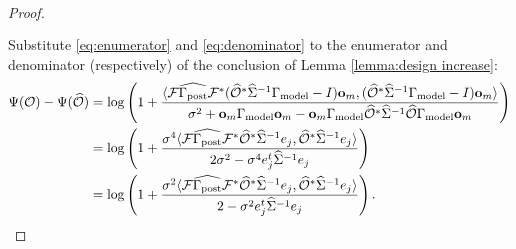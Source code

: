 \documentclass{amsart}
\numberwithin{equation}{section}
\begin{document}
\begin{proof}
\begin{align}
\begin{split}
    \end{split}
  \end{align}
  Substitute \eqref{eq:enumerator} and \eqref{eq:denominator} to
  the enumerator and denominator (respectively) of the conclusion of
  Lemma \ref{lemma:design increase}:
  \begin{align*}
    \Psi( \mathcal{O} ) - \Psi (\widehat{\mathcal{O}} ) &=
    \log \left ( 1 + \frac{
      \langle \mathcal{F} \widehat{\Gamma_{\textup{post}}} \mathcal{F}^* (\widehat{\mathcal{O}}^* \widehat{\Sigma}^{-1} \Gamma_{\textup{model}} - I ) \mathbf{o}_m,
      (\widehat{\mathcal{O}}^* \widehat{\Sigma}^{-1} \Gamma_{\textup{model}} - I ) \mathbf{o}_m \rangle
    }{
      \sigma^2 + \mathbf{o}_m \Gamma_{\textup{model}} \mathbf{o}_m - \mathbf{o}_m \Gamma_{\textup{model}} \widehat{\mathcal{O}}^* \widehat{\Sigma}^{-1} \widehat{\mathcal{O}} \Gamma_{\textup{model}} \mathbf{o}_m 
    }       
    \right ) \\
    &= \log \left ( 1 + \frac{\sigma^4
      \langle \mathcal{F} \widehat{\Gamma_{\textup{post}}} \mathcal{F}^* \widehat{\mathcal{O}}^* \widehat{\Sigma}^{-1} e_j,
      \widehat{\mathcal{O}}^* \widehat{\Sigma}^{-1}e_j \rangle
    }{
      2\sigma^2 - \sigma^4 e_j^t\widehat{\Sigma}^{-1}e_j 
    }       
    \right ) \\
    &= \log \left ( 1 + \frac{\sigma^2
      \langle \mathcal{F} \widehat{\Gamma_{\textup{post}}} \mathcal{F}^* \widehat{\mathcal{O}}^* \widehat{\Sigma}^{-1} e_j,
      \widehat{\mathcal{O}}^* \widehat{\Sigma}^{-1}e_j \rangle
    }{
      2 - \sigma^2 e_j^t\widehat{\Sigma}^{-1}e_j 
    }       
    \right ).
  \end{align*}
\end{proof}
\end{document}
